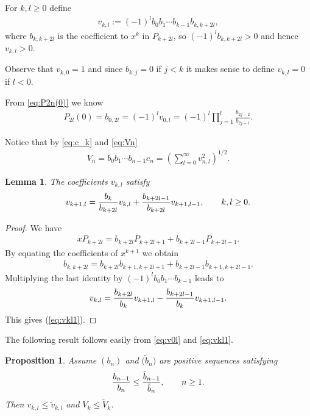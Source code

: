 \documentclass[11pt]{article}
\numberwithin{equation}{section}
\newtheorem{prop}[thm]{Proposition}
\newtheorem{lem}[thm]{Lemma}
\begin{document}
For $k,l\ge 0$ define
\begin{gather}\label{eq:vkl}
v_{k,l}:= (-1)^l b_0b_1\cdots b_{k-1} b_{k,k+2l},
\end{gather}
where $b_{k,k+2l}$ is the coefficient to $x^k$ in $P_{k+2l}$, so $(-1)^lb_{k,k+2l}>0$ and hence $v_{k,l}>0$.

Observe that $v_{k,0}=1$ and since $b_{k,j}=0$ if $j<k$ it makes sense to define $v_{k,l}=0$ if $l<0$.

From \eqref{eq:P2n(0)} we know
\begin{gather}\label{eq:v0l}
P_{2l}(0)=b_{0,2l}=(-1)^lv_{0,l}=(-1)^l\prod_{j=1}^l \frac{b_{2j-2}}{b_{2j-1}}.
\end{gather}

Notice that by \eqref{eq:c_k} and \eqref{eq:Vn}
\begin{gather}\label{eq:V_n1}
V_n=b_0b_1\cdots b_{n-1} c_n=\left(\sum_{l=0}^\infty v_{n,l}^2\right)^{1/2}.
\end{gather}

\begin{lem}\label{thm:vkl}
The coefficients $v_{k,l}$ satisfy
\begin{gather}\label{eq:vkl1} v_{k+1,l}={b_k\over b_{k+2l}}v_{k,l}+ {b_{k+2l-1}\over b_{k+2l}}v_{k+1,l-1},\qquad k,l\ge 0.
\end{gather}
\end{lem}

\begin{proof}We have
\begin{gather*}
x P_{k+2l}=b_{k+2l}P_{k+2l+1}+b_{k+2l-1}P_{k+2l-1}.
\end{gather*}
By equating the coefficients of $x^{k+1}$ we obtain
\begin{gather*}
b_{k,k+2l}=b_{k+2l}b_{k+1,k+2l+1}+ b_{k+2l-1}b_{k+1,k+2l-1}.
\end{gather*}
Multiplying the last identity by $(-1)^lb_0b_1\cdots b_{k-1}$ leads to
\begin{gather*}
 v_{k,l}={b_{k+2l}\over b_k}v_{k+1,l}- { b_{k+2l-1}\over b_k}v_{k+1,l-1}.
\end{gather*}
 This gives (\ref{eq:vkl1}).
\end{proof}

The following result follows easily from \eqref{eq:v0l} and \eqref{eq:vkl1}.

\begin{prop}\label{thm:compV} Assume $(b_n)$ and $\big(\tilde{b}_n\big)$ are positive sequences satisfying
\begin{gather*}
{b_{n-1}\over b_{n}} \le {\tilde{b}_{n-1}\over \tilde{b}_{n}} ,\qquad n\ge 1.
\end{gather*}
 Then $v_{k,l} \le \tilde{v}_{k,l} $ and $V_k \le \tilde{V}_k$.
\end{prop}
\end{document}
